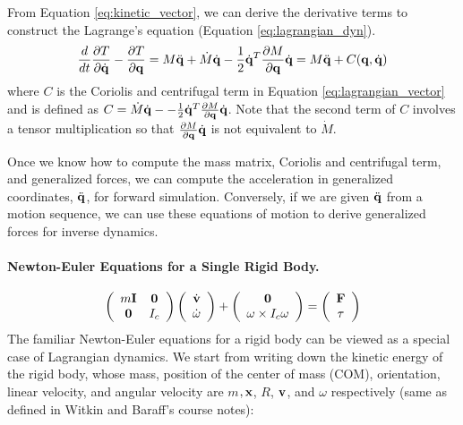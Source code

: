 From Equation \ref{eq:kinetic_vector}, we can derive the derivative
terms to construct the Lagrange's equation (Equation
\ref{eq:lagrangian_dyn}).
\begin{equation}
\frac{d}{dt}\frac{\partial T}{\partial \dot{\mathbf{q}}} - \frac{\partial
  T}{\partial \mathbf{q}} = M\ddot{\mathbf{q}} + \dot{M} \dot{\mathbf{q}} - \frac{1}{2}\dot{\mathbf{q}}^T \frac{\partial M}{\partial \mathbf{q}} \dot{\mathbf{q}} = M
\ddot{\mathbf{q}} + C(\mathbf{q}, \dot{\mathbf{q}})
\end{equation}
where $C$ is the Coriolis and centrifugal term in Equation
\ref{eq:lagrangian_vector} and is defined as $C = \dot{M}
\dot{\mathbf{q}} - - \frac{1}{2}\dot{\mathbf{q}}^T \frac{\partial M}{\partial
  \mathbf{q}} \dot{\mathbf{q}}$. Note that the second term of $C$ involves a
tensor multiplication so that $\frac{\partial M}{\partial
  \mathbf{q}} \dot{\mathbf{q}}$ is not equivalent to $\dot{M}$.

Once we know how to compute the mass matrix, Coriolis and centrifugal
term, and generalized forces, we can compute the acceleration in
generalized coordinates, $\ddot{\mathbf{q}}$, for forward
simulation. Conversely, if we are given $\ddot{\mathbf{q}}$ from a motion
sequence, we can use these equations of motion to derive generalized
forces for inverse dynamics. 

\paragraph{Newton-Euler Equations for a Single Rigid Body.}
\begin{equation}
\left(
\begin{array}{cc}
m\mathbf{I} & \mathbf{0} \\
\mathbf{0} & I_c 
\end{array}
\right)
\left(
\begin{array}{c}
\dot{\mathbf{v}} \\
\dot{\omega} 
\end{array}
\right) +
\left(
\begin{array}{c}
\mathbf{0}  \\
\omega \times I_c \omega 
\end{array}
\right) = 
\left(
\begin{array}{c}
\mathbf{F} \\
\tau 
\end{array}
\right)
\end{equation}
The familiar Newton-Euler equations for a rigid body can be viewed as
a special case of Lagrangian dynamics. We start from writing down the
kinetic energy of the rigid body, whose mass, position of the center
of mass (COM), orientation,
linear velocity, and angular velocity are $m$$, \mathbf{x}$, $R$,
$\mathbf{v}$, and $\omega$ respectively (same as defined in Witkin and
Baraff's course notes):


